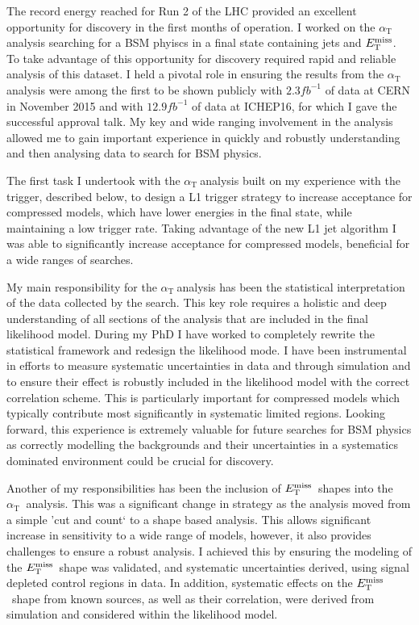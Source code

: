 \documentclass[11pt]{article}
\theoremstyle{plain} \numberwithin{equation}{section}
\theoremstyle{definition}
\DeclareRobustCommand{\alphat}{$\alpha_{\text{T}}~$}
\DeclareRobustCommand{\met}{$\mbox{$E_\text{T}^{\rm miss}$}\xspace$}
\newcounter{list}
\begin{document}
The record energy reached for Run 2 of the LHC provided an excellent opportunity for discovery
in the first months of operation. I worked on the \alphat analysis searching for a BSM phyiscs in a 
final state containing jets and \met. 
To take advantage of this opportunity for discovery required rapid and reliable analysis of this dataset. 
I held a pivotal role in ensuring the results from the \alphat analysis were among the 
first to be shown publicly with $2.3{fb}^{-1}$ of data at CERN in November 2015
and with $12.9{fb}^{-1}$ of data at ICHEP16, for which I gave the successful
approval talk. My key and wide ranging involvement in the analysis allowed me to gain important experience 
in quickly and robustly understanding and then analysing data to search for BSM physics. 

The first task I undertook with the \alphat analysis built on my experience with the 
trigger, described below, to design a L1 trigger strategy to increase acceptance for compressed models,
which have lower energies in the final state, while maintaining a low trigger rate. 
Taking advantage of the new L1 jet algorithm I was able to significantly increase 
acceptance for compressed models, beneficial for a wide ranges of searches.

My main responsibility for the \alphat analysis has been the statistical interpretation
of the data collected by the search. This key role requires a holistic and deep understanding
of all sections of the analysis that are included in the final likelihood model. During my
PhD I have worked to completely rewrite the statistical framework and redesign the likelihood mode. 
I have been instrumental in efforts to measure systematic uncertainties in data and through simulation and to
ensure their effect is robustly included in the likelihood 
model with the correct correlation scheme. This is particularly important for compressed models which typically
contribute most significantly in systematic limited regions. Looking forward, this experience is extremely valuable 
for future searches for BSM physics as correctly modelling the backgrounds and their uncertainties in a systematics 
dominated environment could be crucial for discovery.

Another of my responsibilities has been the inclusion of \met~shapes into the \alphat
analysis. This was a significant change in strategy as the analysis moved from a simple 'cut and
count` to a shape based analysis. This allows significant increase in sensitivity to a wide 
range of models, however, it also provides challenges to ensure a robust analysis. I achieved this
by ensuring the modeling of the \met~shape was validated, and systematic uncertainties derived, 
using signal depleted control regions in data. In addition, systematic effects on the \met~shape from known sources,
as well as their correlation, were derived from simulation and considered within the likelihood model.
\end{document}
